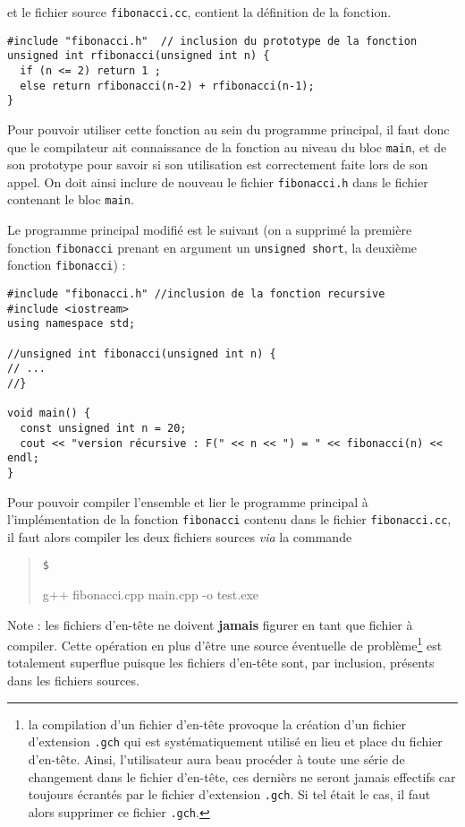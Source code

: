 \documentclass{book}
\newenvironment{prompt}{\begin{quote}\color{blue!75}\tt\$\,
}{\end{quote}}
\begin{document}
\begin{correction}
et le fichier source \texttt{fibonacci.cc}, contient la définition de la fonction.

\begin{verbatim}
#include "fibonacci.h"  // inclusion du prototype de la fonction
unsigned int rfibonacci(unsigned int n) {
  if (n <= 2) return 1 ;
  else return rfibonacci(n-2) + rfibonacci(n-1);
}
\end{verbatim}

Pour pouvoir utiliser cette fonction au sein du programme principal, il faut
donc que le compilateur ait connaissance de la fonction au niveau du bloc \texttt{main}, et de son prototype pour savoir si son utilisation est correctement faite lors de son appel. On doit ainsi inclure de nouveau le fichier \texttt{fibonacci.h}
dans le fichier contenant le bloc \texttt{main}.

Le programme principal modifié est le suivant (on a supprimé la première fonction
\texttt{fibonacci} prenant en argument un \texttt{unsigned short}, la deuxième
fonction \texttt{fibonacci}) :

\begin{verbatim}
#include "fibonacci.h" //inclusion de la fonction recursive
#include <iostream>
using namespace std;

//unsigned int fibonacci(unsigned int n) {
// ...
//}

void main() {
  const unsigned int n = 20;
  cout << "version récursive : F(" << n << ") = " << fibonacci(n) << endl;
}
\end{verbatim}

Pour pouvoir compiler l'ensemble et lier le programme principal à
l'implémentation de la fonction \texttt{fibonacci} contenu dans le fichier \texttt{fibonacci.cc},
il faut alors compiler les deux fichiers sources \emph{via} la commande
\begin{prompt}
g++ fibonacci.cpp main.cpp -o test.exe
\end{prompt}
Note : les fichiers d'en-tête ne doivent \textbf{jamais} figurer en tant que fichier à
compiler. Cette opération en plus d'être une source éventuelle de problème\footnote{la compilation d'un fichier d'en-tête provoque la création d'un fichier d'extension \texttt{.gch} qui est systématiquement utilisé en lieu et place du fichier d'en-tête. Ainsi, l'utilisateur aura beau procéder à toute une série de changement dans le fichier d'en-tête, ces dernièrs ne seront jamais effectifs car toujours écrantés par le fichier d'extension \texttt{.gch}. Si tel était le cas, il faut alors supprimer ce fichier \texttt{.gch}.} est totalement superflue puisque les fichiers d'en-tête
sont, par inclusion, présents dans les fichiers sources.


\end{correction}
\end{document}
